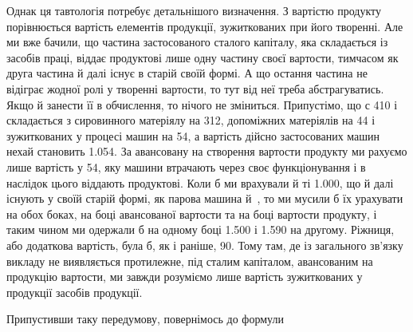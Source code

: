 Однак ця тавтологія потребує детальнішого визначення. З вартістю продукту порівнюється вартість
елементів продукції, зужиткованих при його творенні. Але ми вже бачили, що частина застосованого
сталого капіталу, яка складається із засобів праці, віддає продуктові лише одну частину своєї
вартости, тимчасом як друга частина й далі існує в старій своїй формі. А що остання частина не
відіграє жодної ролі у творенні вартости, то тут від неї треба абстрагуватись. Якщо й занести її в
обчислення, то нічого не зміниться. Припустімо, що с \deq{} 410 і
складається з сировинного матеріялу на 312, допоміжних матеріялів на 44 і зужиткованих
у процесі машин на 54, а вартість дійсно застосованих машин нехай становить \num{1.054}. За авансовану на створення вартости продукту ми рахуємо лише вартість у 54, яку машини втрачають через своє функціонування і в наслідок цього віддають продуктові.
Коли б ми врахували
й ті \num{1.000}, що й далі існують у своїй старій формі, як парова машина й~, то
ми мусили б їх урахувати
на обох боках, на боці авансованої вартости та на боці вартости продукту, і таким чином ми
одержали б на одному боці
\num{1.500} і \num{1.590} на другому. Ріжниця, або додаткова вартість, була
б, як і раніше, 90. Тому там, де із загального зв’язку викладу не виявляється
протилежне, під сталим капіталом, авансованим на продукцію
вартости, ми завжди розуміємо лише вартість зужиткованих
у продукції засобів продукції.

Припустивши таку передумову, повернімось до формули

